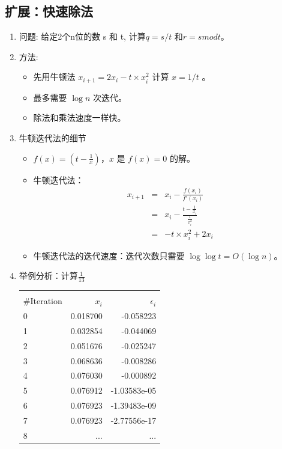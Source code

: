 \subsection{扩展：快速除法}

\begin{enumerate}
\item
	问题: 给定2个n位的数 s 和 t, 计算$ q=s/t$ 和$r=s mod t$。
\item
	方法: 
	\begin{itemize}
	\item 先用牛顿法 $x_{i+1} =  2 x_i - t \times x_i^2 $ 计算 $ x = 1 / t$ 。

	\item 最多需要 $\log n$ 次迭代。

	\item	除法和乘法速度一样快。 
	\end{itemize}
\item
	牛顿迭代法的细节
	\begin{itemize}
	 \item  $f(x) = (t - \frac{1}{x})$，$x$ 是 $f(x) = 0$ 的解。
	  \item 牛顿迭代法： 
 	\begin{eqnarray}
		 x_{i+1} &=& x_i - \frac{f(x_i)}{f'(x_i)} \\
         &=& x_i - \frac{t-\frac{1}{x_i}}{ \frac{1}{x_i^2} } \\
         &=& - t\times x_i^2 + 2 x_i 
 	\end{eqnarray}
	 \item 牛顿迭代法的迭代速度：迭代次数只需要 $\log \log t = O(\log n)$。
\end{itemize}
\item 
	举例分析：计算$ \frac{1}{13}$
\begin{center} 
\begin{tabular}{ l r r } 
\hline \\
\#Iteration & $x_i$ & $\epsilon_i$ \\ 
\hline 
 0	&0.018700	&-0.058223 \\
1	&0.032854	&-0.044069  \\
2	&0.051676	&-0.025247 \\
3	&0.068636	&-0.008286 \\
4	&0.076030	&-0.000892 \\
5	&0.076912	&-1.03583e-05 \\
6	&0.076923	&-1.39483e-09 \\
7	&0.076923	&-2.77556e-17 \\
8	&...	&... \\
 \hline
\end{tabular}
\end{center} 
	
\end{enumerate}
	
